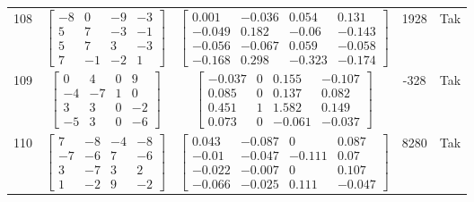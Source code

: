 \documentclass[a4paper,12pt]{article}
\begin{document}
\begin{tabular}{c c c c c}
108
&
$\begin{bmatrix} -8 & 0 & -9 & -3 \\ 5 & 7 & -3 & -1 \\ 5 & 7 & 3 & -3 \\ 7 & -1 & -2 & 1 \end{bmatrix}$
&
$\begin{bmatrix} 0.001 & -0.036 & 0.054 & 0.131 \\ -0.049 & 0.182 & -0.06 & -0.143 \\ -0.056 & -0.067 & 0.059 & -0.058 \\ -0.168 & 0.298 & -0.323 & -0.174 \end{bmatrix}$
&
1928
&
Tak
\\
109
&
$\begin{bmatrix} 0 & 4 & 0 & 9 \\ -4 & -7 & 1 & 0 \\ 3 & 3 & 0 & -2 \\ -5 & 3 & 0 & -6 \end{bmatrix}$
&
$\begin{bmatrix} -0.037 & 0 & 0.155 & -0.107 \\ 0.085 & 0 & 0.137 & 0.082 \\ 0.451 & 1 & 1.582 & 0.149 \\ 0.073 & 0 & -0.061 & -0.037 \end{bmatrix}$
&
-328
&
Tak
\\
110
&
$\begin{bmatrix} 7 & -8 & -4 & -8 \\ -7 & -6 & 7 & -6 \\ 3 & -7 & 3 & 2 \\ 1 & -2 & 9 & -2 \end{bmatrix}$
&
$\begin{bmatrix} 0.043 & -0.087 & 0 & 0.087 \\ -0.01 & -0.047 & -0.111 & 0.07 \\ -0.022 & -0.007 & 0 & 0.107 \\ -0.066 & -0.025 & 0.111 & -0.047 \end{bmatrix}$
&
8280
&
Tak
\\
\end{tabular} \egroup \newpage
\end{document}
